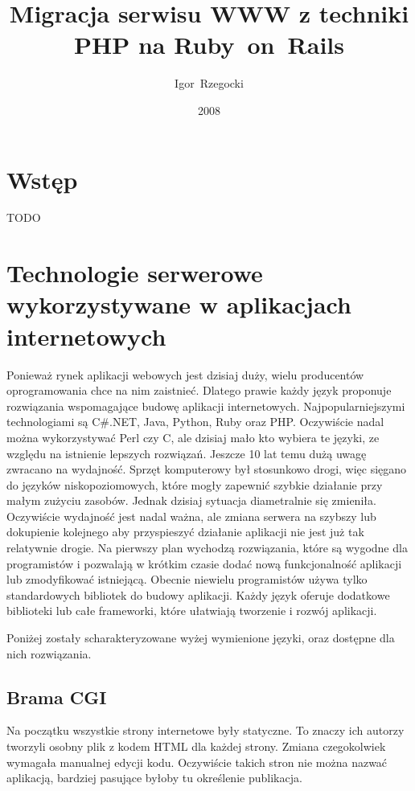 \documentclass[a4paper,12pt,oneside]{report}
\author{Igor~Rzegocki}
\title{Migracja serwisu WWW z techniki PHP na Ruby~on~Rails}
\date{2008}
\begin{document}
\maketitle
\tableofcontents

\chapter{Wstęp}
\label{cha:wstep}

TODO

\chapter[Technologie po stronie serwera]{Technologie serwerowe wykorzystywane w aplikacjach internetowych}
\label{cha:serwer}

Ponieważ rynek aplikacji webowych jest dzisiaj duży, wielu producentów oprogramowania chce na nim zaistnieć. Dlatego prawie każdy język proponuje rozwiązania wspomagające budowę aplikacji internetowych. Najpopularniejszymi technologiami są C\#.NET, Java, Python, Ruby oraz PHP. Oczywiście nadal można wykorzystywać Perl czy C, ale dzisiaj mało kto wybiera te języki, ze względu na istnienie lepszych rozwiązań. Jeszcze 10 lat temu dużą uwagę zwracano na wydajność. Sprzęt komputerowy był stosunkowo drogi, więc sięgano do języków niskopoziomowych, które mogły zapewnić szybkie działanie przy małym zużyciu zasobów. Jednak dzisiaj sytuacja diametralnie się zmieniła. Oczywiście wydajność jest nadal ważna, ale zmiana serwera na szybszy lub dokupienie kolejnego aby przyspieszyć działanie aplikacji nie jest już tak relatywnie drogie. Na pierwszy plan wychodzą rozwiązania, które są wygodne dla programistów i pozwalają w krótkim czasie dodać nową funkcjonalność aplikacji lub zmodyfikować istniejącą. Obecnie niewielu programistów używa tylko standardowych bibliotek do budowy aplikacji. Każdy język oferuje dodatkowe biblioteki lub całe frameworki, które ułatwiają tworzenie i rozwój aplikacji. 

Poniżej zostały scharakteryzowane wyżej wymienione języki, oraz dostępne dla nich rozwiązania.

\section{Brama CGI}
\label{sec:cgi}
Na początku wszystkie strony internetowe były statyczne. To znaczy ich autorzy tworzyli osobny plik z kodem HTML dla każdej strony. Zmiana czegokolwiek wymagała manualnej edycji kodu. Oczywiście takich stron nie można nazwać aplikacją, bardziej pasujące byłoby tu określenie publikacja.
\end{document}
